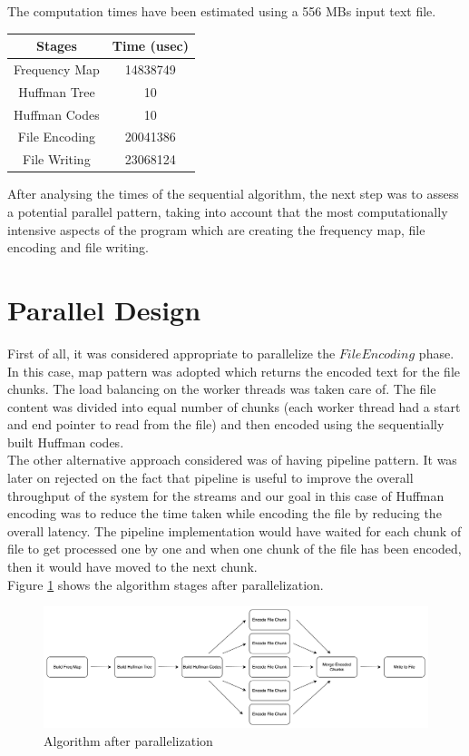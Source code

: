 \documentclass[12pt, letterpaper]{article}  %
\begin{document}
The computation times have been estimated using a 556 MBs input text file.

\begin{center}
\begin{tabular}{ |c|c| }
 \hline
 \textbf{Stages}& \textbf{Time (usec)} \\
 \hline
 Frequency Map & 14838749 \\
 \hline
 Huffman Tree & 10 \\
 \hline
 Huffman Codes & 10 \\
 \hline
 File Encoding & 20041386 \\
 \hline
 File Writing & 23068124 \\  
 \hline
\end{tabular}
\end{center}
\FloatBarrier

After analysing the times of the sequential algorithm, the next step was to assess a potential parallel pattern, taking into account that the most computationally intensive aspects of the program which are creating the frequency map, file encoding and file writing.

\section{Parallel Design}
First of all, it was considered appropriate to parallelize the $File Encoding$ phase. In this case, map pattern was adopted which returns the encoded text for the file chunks. The load balancing on the worker threads was taken care of. The file content was divided into equal number of chunks (each worker thread had a start and end pointer to read from the file) and then encoded using the sequentially built Huffman codes. \\
The other alternative approach considered was of having pipeline pattern. It was later on rejected on the fact that pipeline is useful to improve the overall throughput of the system for the streams and our goal in this case of Huffman encoding was to reduce the time taken while encoding the file by reducing the overall latency. The pipeline implementation would have waited for each chunk of file to get processed one by one and when one chunk of the file has been encoded, then it would have moved to the next chunk. \\

Figure \ref{fig:map_pattern} shows the algorithm stages after parallelization.

\begin{figure}[h!]
    \centering
    \includegraphics[width=1 \textwidth]{Images/map-pattern.png}
    \caption{Algorithm after parallelization}
    \label{fig:map_pattern}
\end{figure}
\FloatBarrier
\end{document}
